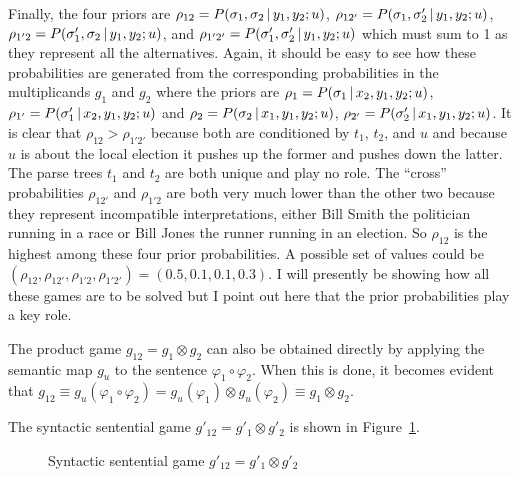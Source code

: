 Finally, the four priors are $\rho_{12} = P(\sigma_1, \sigma_2 \,|\, y_1, y_ 2; u)$, $\rho_{12'} = P(\sigma_1, \sigma'_2 \,|\, y_1, y_2; u)$, $\rho_{1'2} = P(\sigma'_1, \sigma_2 \,|\, y_1, y_2; u)$, and $\rho_{1'2'} = P(\sigma'_1, \sigma'_2 \,|\, y_1, y_2; u)$  which must sum to 1 as they represent all the alternatives. Again, it should be easy to see how these probabilities are generated from the corresponding probabilities in the multiplicands $g_1$ and $g_2$ where the priors are $\rho_1 = P(\sigma_1 \,|\, x_2, y_1, y_2; u)$, $\rho_{1'} = P(\sigma'_1 \,|\, x_2, y_1, y_2; u)$  and $\rho_2 = P(\sigma_2 \,|\, x_1, y_1, y_2; u)$, $\rho_{2'} = P(\sigma'_2 \,|\, x_1, y_1, y_2; u)$. It is clear that $\rho_{12} > \rho_{1'2'}$ because both are conditioned by $t_1$, $t_2$, and $u$ and because $u$ is about the local election it pushes up the former and pushes down the latter. The parse trees $t_1$ and $t_2$ are both unique and play no role. The ``cross'' probabilities $\rho_{12'}$ and $\rho_{1'2}$ are both very much lower than the other two because they represent incompatible interpretations, either Bill Smith the politician running in a race or Bill Jones the runner running in an election. So $\rho_{12}$ is the highest among these four prior probabilities. A possible set of values could be $(\rho_{12}, \rho_{12'}, \rho_{1'2}, \rho_{1'2'}) = (0.5, 0.1, 0.1, 0.3)$. I will presently be showing how all these games are to be solved but I point out here that the prior probabilities play a key role.

The product game $g_{12} = g_1 \otimes g_2$ can also be obtained directly by applying the semantic map $g_u$ to the sentence $\varphi_1 \circ \varphi_2$. When this is done, it becomes evident that $g_{12} \equiv g_u(\varphi_1 \circ \varphi_2) = g_u(\varphi_1) \otimes g_u(\varphi_2) \equiv g_1 \otimes g_2$.

The syntactic sentential game $g'_{12} = g'_1 \otimes g'_2$ is shown in Figure~\ref{fig:syntactic sentential game g12'}.

\begin{figure}[h] 

\caption{Syntactic sentential game $g'_{12} = g'_1 \otimes g'_2$}
\label{fig:syntactic sentential game g12'}
\end{figure}

